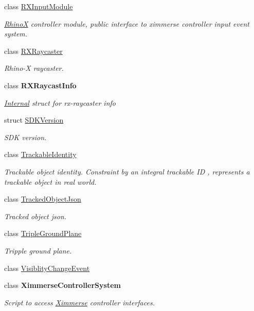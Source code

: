 \begin{DoxyCompactItemize}
class \mbox{\hyperlink{class_ximmerse_1_1_rhino_x_1_1_r_x_input_module}{R\+X\+Input\+Module}}
\begin{DoxyCompactList}\small\item\em \mbox{\hyperlink{namespace_ximmerse_1_1_rhino_x}{RhinoX}} controller module, public interface to ximmerse controller input event system. \end{DoxyCompactList}\item 
class \mbox{\hyperlink{class_ximmerse_1_1_rhino_x_1_1_r_x_raycaster}{R\+X\+Raycaster}}
\begin{DoxyCompactList}\small\item\em Rhino-\/X raycaster. \end{DoxyCompactList}\item 
class {\bfseries R\+X\+Raycast\+Info}
\begin{DoxyCompactList}\small\item\em \mbox{\hyperlink{namespace_ximmerse_1_1_rhino_x_1_1_internal}{Internal}} struct for rx-\/raycaster info \end{DoxyCompactList}\item 
struct \mbox{\hyperlink{struct_ximmerse_1_1_rhino_x_1_1_s_d_k_version}{S\+D\+K\+Version}}
\begin{DoxyCompactList}\small\item\em S\+DK version. \end{DoxyCompactList}\item 
class \mbox{\hyperlink{class_ximmerse_1_1_rhino_x_1_1_trackable_identity}{Trackable\+Identity}}
\begin{DoxyCompactList}\small\item\em Trackable object identity. Constraint by an integral trackable ID , represents a trackable object in real world. \end{DoxyCompactList}\item 
class \mbox{\hyperlink{class_ximmerse_1_1_rhino_x_1_1_tracked_object_json}{Tracked\+Object\+Json}}
\begin{DoxyCompactList}\small\item\em Tracked object json. \end{DoxyCompactList}\item 
class \mbox{\hyperlink{class_ximmerse_1_1_rhino_x_1_1_triple_ground_plane}{Triple\+Ground\+Plane}}
\begin{DoxyCompactList}\small\item\em Tripple ground plane. \end{DoxyCompactList}\item 
class \mbox{\hyperlink{class_ximmerse_1_1_rhino_x_1_1_visiblity_change_event}{Visiblity\+Change\+Event}}
\item 
class {\bfseries Ximmerse\+Controller\+System}
\begin{DoxyCompactList}\small\item\em Script to access \mbox{\hyperlink{namespace_ximmerse}{Ximmerse}} controller interfaces. \end{DoxyCompactList}\end{DoxyCompactItemize}
